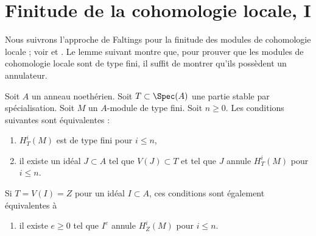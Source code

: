 \section{Finitude de la cohomologie locale, I}
\label{section-finiteness}

\noindent
Nous suivrons l'approche de Faltings pour la finitude des modules de cohomologie locale ; voir \cite{Faltings-annulators} et \cite{Faltings-finiteness}. Le lemme suivant montre que, pour prouver que les modules de cohomologie locale sont de type fini, il suffit de montrer qu'ils possèdent un annulateur.

\begin{lemma}
\label{lemma-check-finiteness-local-cohomology-by-annihilator}
\begin{reference}
\cite[Lemma 3]{Faltings-annulators}
\end{reference}
Soit $A$ un anneau noethérien. Soit $T \subset \Spec(A)$ une partie stable par spécialisation. Soit $M$ un $A$-module de type fini. Soit $n \geq 0$. Les conditions suivantes sont équivalentes :
\begin{enumerate}
\item $H^i_T(M)$ est de type fini pour $i \leq n$,
\item il existe un idéal $J \subset A$ tel que $V(J) \subset T$ et tel que $J$ annule $H^i_T(M)$ pour $i \leq n$.
\end{enumerate}
Si $T = V(I) = Z$ pour un idéal $I \subset A$, ces conditions sont également équivalentes à
\begin{enumerate}
\item[(3)] il existe $e \geq 0$ tel que $I^e$ annule $H^i_Z(M)$ pour $i \leq n$.
\end{enumerate}
\end{lemma}

